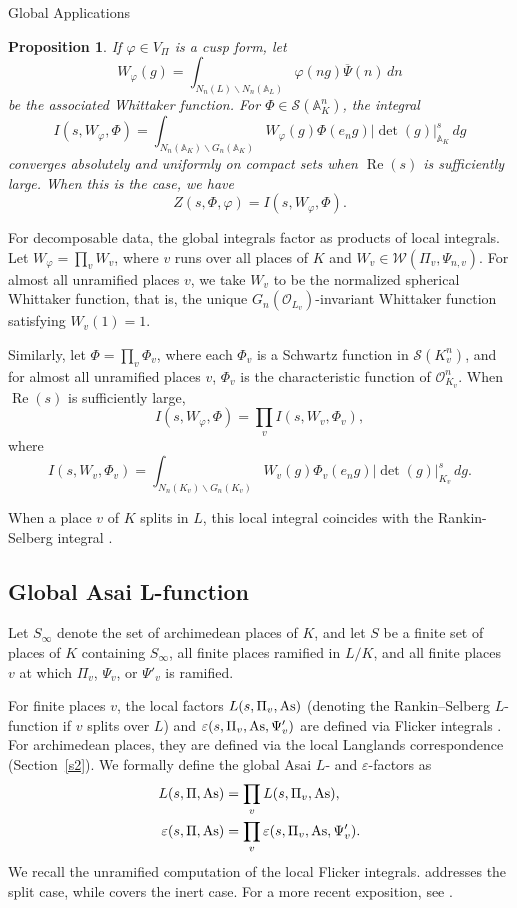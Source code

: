 \documentclass[12pt,reqno]{amsart}
\numberwithin{equation}{section}%
\numberwithin{equation}{subsection}
\newtheorem{prop}[equation]{Proposition}
\theoremstyle{definition}
\theoremstyle{remark}
\begin{document}
\begin{section}{Global Applications}
\begin{prop}\label{global-duo1}
If $\varphi \in V_\Pi$ is a cusp form, let
\[
W_\varphi(g) = \int_{N_n(L)\backslash N_n(\mathbb{A}_L)} \varphi(ng)\overline{\Psi}(n) \, dn
\]
be the associated Whittaker function. For $\Phi \in \mathcal{S}(\mathbb{A}_K^n)$, the integral
\[
I(s, W_\varphi, \Phi) = \int_{N_n(\mathbb{A}_K)\backslash G_n(\mathbb{A}_K)} W_\varphi(g)\Phi(e_n g)|\det(g)|_{\mathbb{A}_K}^s \, dg
\]
converges absolutely and uniformly on compact sets when $\operatorname{Re}(s)$ is sufficiently large. When this is the case, we have
\[
Z(s, \Phi, \varphi) = I(s, W_\varphi, \Phi).
\]
\end{prop}

For decomposable data, the global integrals factor as products of local
integrals. Let \(W_\varphi=\prod_v W_v\), where \(v\) runs over all
places of \(K\) and \(W_v\in\mathcal{W}(\Pi_v,\Psi_{n,v})\). For almost
all unramified places \(v\), we take \(W_v\) to be the normalized
spherical Whittaker function, that is, the unique
\(G_n(\mathcal{O}_{L_v})\)-invariant Whittaker function satisfying
\(W_v(1)=1\).

Similarly, let $\Phi = \prod_v \Phi_v$, where each $\Phi_v$ is a Schwartz function in $\mathcal{S}(K_v^n)$, and for almost all unramified places $v$, $\Phi_v$ is the characteristic function of $\mathcal{O}_{K_v}^n$. When $\operatorname{Re}(s)$ is sufficiently large,
\[
I(s, W_\varphi, \Phi) = \prod_v I(s, W_v, \Phi_v),
\]
where
\[
I(s, W_v, \Phi_v) = \int_{N_n(K_v)\backslash G_n(K_v)} W_v(g)\Phi_v(e_n g)|\det(g)|_{K_v}^s \, dg.
\]

When a place $v$ of $K$ splits in $L$, this local integral coincides with the Rankin-Selberg integral \cite{JPSS1983}. 

\subsection{Global Asai L-function}

Let \(S_\infty\) denote the set of archimedean places of \(K\), and let
\(S\) be a finite set of places of \(K\) containing \(S_\infty\), all
finite places ramified in \(L/K\), and all finite places \(v\) at which
\(\Pi_v\), \(\Psi_v\), or \(\Psi'_v\) is ramified.

For finite places $v$, the local factors $L(s,\Pi_v, {\rm As})$ (denoting the Rankin--Selberg $L$-function if $v$ splits over $L$) and $\varepsilon(s,\Pi_v, {\rm As},\Psi'_{v})$ are defined via Flicker integrals \cite{Fli1993,Kab2004,JPSS1983}. For archimedean places, they are defined via the local Langlands correspondence (Section~\ref{s2}). We formally define the global Asai $L$- and $\varepsilon$-factors as
\[
\begin{aligned}
L(s,\Pi,{\rm As})
&=\prod_v L(s,\Pi_v,{\rm As}),\\
\varepsilon(s,\Pi,{\rm As})
&=\prod_v\varepsilon(s,\Pi_v,{\rm As},\Psi'_{v}).
\end{aligned}
\]
We recall the unramified computation of the local Flicker integrals. \cite{JPSS1983} addresses the split case, while \cite{Fli1988} covers the inert case. For a more recent exposition, see \cite{BP2021}.


\end{section}
\end{document}
